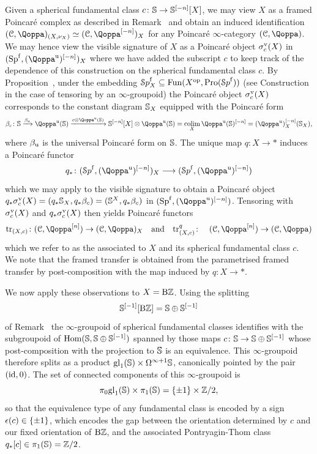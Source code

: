\begin{construction}
\label{construction:visible-sig-c}%
Given a spherical fundamental class $c\colon \mathbb{S} \to \mathbb{S}^{[-n]}[X]$, we may view $X$ as a framed Poincar\'e complex as described in Remark~ and obtain an induced identification %
$(\C, \QF)_{(X, \nu_X)}\simeq (\C, \QF\qshift{-n})_X$ for any Poincaré $\infty$-category $(\C,\QF)$. We may hence view the visible signature of $X$ as a Poincar\'e object $\sigma^{\mathrm{v}}_c(X)$ in $(\Sp^\free, (\QF^\uni)\qshift{-n})_X$ where we have added the subscript $c$ to keep track of the dependence of this construction on the spherical fundamental class $c$. 
By Proposition~,
under the embedding ${\mathcal Sp}^{\mathrm{f}}_X \subseteq \operatorname{Fun}(X^\mathrm{op},\operatorname{Pro}({\mathcal Sp}^{\mathrm{f}}))$ (see Construction~ in the case of tensoring by an $\infty$-groupoid) the Poincaré object $\sigma^{\mathrm{v}}_c(X)$ corresponds to the 
constant diagram $\mathbb{S}_X$ equipped with the Poincar\'e form
\[
\beta_c\colon \SS \xrightarrow{\bet_{\uni}} \QF^{\uni}(\SS) \xrightarrow{c\otimes \QF^{\uni}(\SS)} \SS\qshift{-n}[X] \otimes \QF^{\uni}(\SS) = \colim_{X} \QF^{\uni}(\SS)\qshift{-n} = (\QF^\uni)_X\qshift{-n}(\SS_X) ,
\]
where $\beta_{\mathrm{u}}$ is the universal Poincaré form on $\mathbb{S}$. 
The unique map $q\colon X \to \ast$ induces a Poincar\'e functor
\[
q_*\colon (\Spaf,(\QF^{\uni})\qshift{-n})_{X} \longrightarrow (\Spaf,(\QF^{\uni})\qshift{-n})
\]
which we may apply to the visible signature to obtain a 
Poincaré object 
$q_*\sigma^{\mathrm{v}}_c(X) = (q_*\mathbb{S}_X,q_*\beta_c) = (\mathbb{S}^{X},q_*\beta_c)$
in $(\Sp^\free,(\QF^\uni)\qshift{-n})$. 
Tensoring with $\sigma^{\mathrm{v}}_c(X)$ and $q_*\sigma^{\mathrm{v}}_c(X)$ then yields 
Poincar\'e functors
\[
\tr_{(X,c)}\colon (\C, \QF\qshift{n})\to (\C, \QF)_X \quad \text{and}\quad \tr_{(X,c)}^q \colon \quad (\C,\QF\qshift{n}) \to (\C,\QF)
\]
which we refer to as the  associated to $X$ and its spherical fundamental class $c$. We note that the framed transfer is obtained from the parametrised framed transfer by post-composition with the map induced by $q\colon X \to \ast$.%
\end{construction}




We now apply these observations to $X=\mathrm{B}\mathbb{Z}$. Using the splitting 
\[
\mathbb{S}^{[-1]}[\mathrm{B}\mathbb{Z}] = \mathbb{S} \oplus \mathbb{S}^{[-1]}
\]
of Remark~
the $\infty$-groupoid of spherical fundamental classes identifies with the 
subgroupoid of $\operatorname{Hom}(\mathbb{S},\mathbb{S} \oplus \mathbb{S}^{[-1]})$
spanned by those maps $c\colon \mathbb{S} \to \mathbb{S} \oplus \mathbb{S}^{[-1]}$ whose post-composition with the projection to $\mathbb{S}$ is an equivalence. This $\infty$-groupoid therefore splits as a product $\mathrm{gl}_1(\mathbb{S}) \times \Omega^{\infty+1}\mathbb{S}$, canonically pointed by the pair $(\mathrm{id},0)$. The set of connected components of this $\infty$-groupoid is
\[
\pi_0\mathrm{gl}_1(\mathbb{S}) \times \pi_1(\mathbb{S}) = \{\pm1\} \times \mathbb{Z}/2 ,
\]
so that the equivalence type of any fundamental class is encoded by a sign 
$\epsilon(c) \in \{\pm1\}$,
which encodes the gap between the orientation determined by $c$ and our fixed orientation of $\mathrm{B}\mathbb{Z}$, and the associated Pontryagin-Thom class $q_*[c] \in \pi_1(\mathbb{S}) = \mathbb{Z}/2$. 


